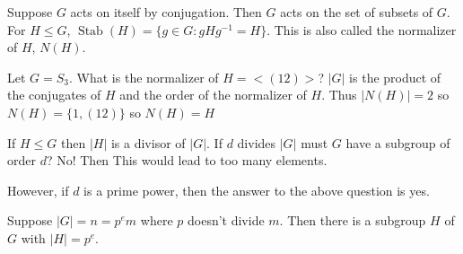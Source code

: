 \documentclass{article}
\DeclareMathOperator{\Stab}{Stab}
\begin{document}
\begin{definition}
Suppose $G$ acts on itself by conjugation. Then $G$ acts on the set of subsets of $G$. For $H\leq G$, $\Stab(H)=\{g\in G:gHg^{-1}=H\}$. This is also called the normalizer of $H$, $N(H)$.
\end{definition}
\begin{example}
Let $G=S_3$. What is the normalizer of $H=<(12)>$? $|G|$ is the product of the conjugates of $H$ and the order of the normalizer of $H$. Thus $|N(H)|=2$ so $N(H)=\{1,(12)\}$ so $N(H)=H$
\end{example}
\begin{theorem}
If $H\leq G$ then $|H|$ is a divisor of $|G|$. If $d$ divides $|G|$ must $G$ have a subgroup of order $d$? No! Then This would lead to too many elements.
\end{theorem}
However, if $d$ is a prime power, then the answer to the above question is yes.
\begin{theorem}
Suppose $|G|=n=p^em$ where $p$ doesn't divide $m$. Then there is a subgroup $H$ of $G$ with $|H|=p^e$.
\end{theorem}
\end{document}
